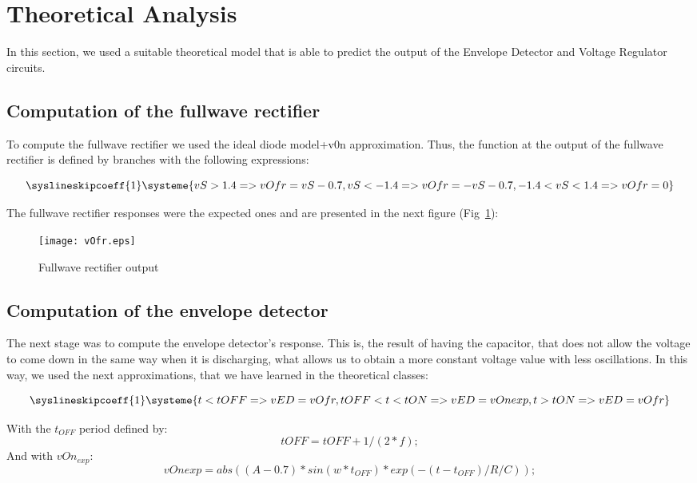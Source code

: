 \section{Theoretical Analysis}
\label{sec:analysis}

In this section, we used a suitable theoretical model that is able to predict the output of the Envelope Detector and Voltage Regulator circuits.

\subsection{Computation of the fullwave rectifier}

To compute the fullwave rectifier we used the ideal diode model+v0n approximation. Thus, the function at the output of the fullwave rectifier is defined by branches with the following expressions:

\[
\syslineskipcoeff{1}
\systeme{vS>1.4 => vOfr= vS-0.7, vS<-1.4 => vOfr= -vS-0.7, -1.4<vS<1.4=> vOfr = 0}
\]

\vspace{0.2in}

The fullwave rectifier responses were the expected ones and are presented in the next figure (Fig~\ref{fig:onda}):


\begin{figure}[h] \centering
\texttt{[image: vOfr.eps]}
\caption{Fullwave rectifier output}
\label{fig:onda}
\end{figure}

\subsection{Computation of the envelope detector}

The next stage was to compute the envelope detector's response. This is, the result of having the capacitor, that does not allow the voltage to come down in the same way when it is discharging, what allows us to obtain a more constant voltage value with less oscillations. In this way, we used the next approximations, that we have learned in the theoretical classes:


\[
\syslineskipcoeff{1}
\systeme{t<tOFF => vED = vOfr,tOFF < t < tON => vED = vOnexp,t>tON=> vED = vOfr}
\]


With the $t_{OFF}$ period defined by:
\begin {equation}
tOFF=tOFF+1/(2*f);
\end{equation}
And with $vOn_{exp}$:
\begin {equation}
vOnexp = abs((A-0.7)*sin(w*t_{OFF})*exp(-(t-t_{OFF})/R/C));
\end{equation}

